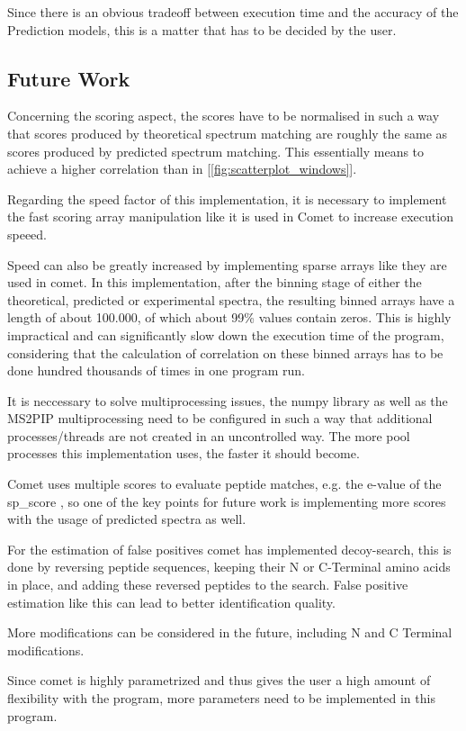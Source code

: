 \documentclass[11pt]{article}
\begin{document}
Since there is an obvious tradeoff between execution time and the accuracy of the Prediction models, this is a matter that has to be decided by the user.

\subsection{Future Work}
Concerning the scoring aspect, the scores have to be normalised in such a way that scores produced by theoretical spectrum matching are roughly the same as scores produced by predicted spectrum matching. This essentially means to achieve a higher correlation than in [\cref{fig:scatterplot_windows}].

Regarding the speed factor of this implementation, it is necessary to implement the fast scoring array manipulation like it is used in Comet to increase execution speeed. 

Speed can also be greatly increased by implementing sparse arrays like they are used in comet. In this implementation, after the binning stage of either the theoretical, predicted or experimental spectra, the resulting binned arrays have a length of about 100.000, of which about 99\% values contain zeros. This is highly impractical and can significantly slow down the execution time of the program, considering that the calculation of correlation on these binned arrays has to be done hundred thousands of times in one program run.

It is neccessary to solve multiprocessing issues, the numpy library as well as the MS2PIP multiprocessing need to be configured in such a way that additional processes/threads are not created in an uncontrolled way. The more pool processes this implementation uses, the faster it should become.

Comet uses multiple scores to evaluate peptide matches, e.g. the e-value of the sp\_score , so one of the key points for future work is implementing more scores with the usage of predicted spectra as well.

For the estimation of false positives comet has implemented decoy-search, this is done by reversing peptide sequences, keeping their N or C-Terminal amino acids in place, and adding these reversed peptides to the search. False positive estimation like this can lead to better identification quality.

More modifications can be considered in the future, including N and C Terminal modifications.

Since comet is highly parametrized and thus gives the user a high amount of flexibility with the program, more parameters need to be implemented in this program.
\end{document}
